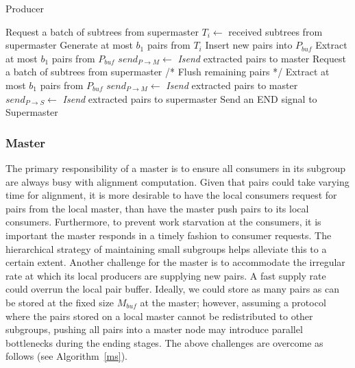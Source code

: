 \documentclass[10pt,journal,letterpaper,compsoc]{IEEEtran}
\begin{document}
\begin{algorithm}
\caption{Producer}
\label{pd}
\begin{algorithmic}[1]
    \STATE Request a batch of subtrees from supermaster
    \WHILE{\TRUE}
        \STATE $T_i \leftarrow$ received subtrees from supermaster 
        \ELSE
        	\REPEAT
                		\STATE Generate at most $b_1$ pairs from $T_i$
                		\STATE Insert new pairs into $P_{buf}$
            		\ENDIF
                	\STATE Extract at most $b_1$ pairs from $P_{buf}$
                	\STATE $send_{P\rightarrow M}\leftarrow$ {\it Isend} extracted pairs to master
            	\ENDIF
        	\STATE Request a batch of subtrees from supermaster
	\ENDIF
    \ENDWHILE
    \STATE /* Flush remaining pairs */
        \STATE Extract at most $b_1$ pairs from $P_{buf}$
            \STATE $send_{P\rightarrow M}\leftarrow$ {\it Isend} extracted pairs to master
        \ENDIF
            \STATE $send_{P\rightarrow S}\leftarrow$ {\it Isend} extracted pairs to supermaster
        \ENDIF
    \ENDWHILE
    \STATE Send an END signal to Supermaster
\end{algorithmic}
\end{algorithm}


\subsubsection{Master}
\label{secMaster}

The primary responsibility of a master is to ensure all consumers in its subgroup are always busy with alignment computation. Given that pairs could take varying time for alignment, it is more desirable to have the local consumers request for pairs from the local master, than have the master push pairs to its local consumers. Furthermore, to prevent work starvation at the consumers, it is important the master responds in a timely fashion to consumer requests. The hierarchical strategy of maintaining small subgroups helps alleviate this to a certain extent. Another challenge for the master is to accommodate the irregular rate at which its local producers are supplying new pairs. A fast supply rate could overrun the local pair buffer. Ideally, we could store as many pairs as can be stored at the fixed size $M_{buf}$ at the master; however, assuming a protocol where the pairs stored on a local master cannot be redistributed to other subgroups, pushing all pairs into a master node may introduce parallel bottlenecks during the ending stages. The above challenges are overcome as follows (see Algorithm~\ref{ms}). 
\end{document}
